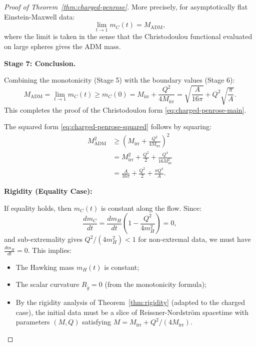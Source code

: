 \documentclass[12pt]{article}
\theoremstyle{plain}
\theoremstyle{definition}
\theoremstyle{remark}
\newcommand{\ADM}{\mathrm{ADM}}
\begin{document}
\begin{proof}[Proof of Theorem~\ref{thm:charged-penrose}]
More precisely, for asymptotically flat Einstein-Maxwell data:
\begin{equation}
    \lim_{t \to 1} m_C(t) = M_{\ADM},
\end{equation}
where the limit is taken in the sense that the Christodoulou functional evaluated on large spheres gives the ADM mass.

\textbf{Stage 7: Conclusion.}

Combining the monotonicity (Stage 5) with the boundary values (Stage 6):
\begin{equation}
    M_{\ADM} = \lim_{t \to 1} m_C(t) \geq m_C(0) = M_{\mathrm{irr}} + \frac{Q^2}{4M_{\mathrm{irr}}} = \sqrt{\frac{A}{16\pi}} + Q^2\sqrt{\frac{\pi}{A}}.
\end{equation}
This completes the proof of the Christodoulou form \eqref{eq:charged-penrose-main}.

The squared form \eqref{eq:charged-penrose-squared} follows by squaring:
\begin{align}
    M_{\ADM}^2 &\geq \left(M_{\mathrm{irr}} + \frac{Q^2}{4M_{\mathrm{irr}}}\right)^2 \\
    &= M_{\mathrm{irr}}^2 + \frac{Q^2}{2} + \frac{Q^4}{16M_{\mathrm{irr}}^2} \\
    &= \frac{A}{16\pi} + \frac{Q^2}{2} + \frac{\pi Q^4}{A}.
\end{align}

\textbf{Rigidity (Equality Case):}

If equality holds, then $m_C(t)$ is constant along the flow. Since:
\[
\frac{d m_C}{dt} = \frac{d m_H}{dt}\left(1 - \frac{Q^2}{4m_H^2}\right) = 0,
\]
and sub-extremality gives $Q^2/(4m_H^2) < 1$ for non-extremal data, we must have $\frac{d m_H}{dt} = 0$. This implies:
\begin{itemize}
    \item The Hawking mass $m_H(t)$ is constant;
    \item The scalar curvature $R_{\tilde{g}} = 0$ (from the monotonicity formula);
    \item By the rigidity analysis of Theorem~\ref{thm:rigidity} (adapted to the charged case), the initial data must be a slice of Reissner-Nordstr\"om spacetime with parameters $(M, Q)$ satisfying $M = M_{\mathrm{irr}} + Q^2/(4M_{\mathrm{irr}})$.
\end{itemize}
\end{proof}
\end{document}
